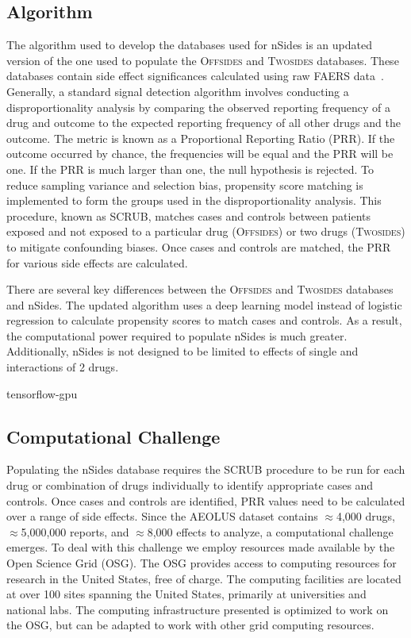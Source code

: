 \documentclass{ws-procs11x85}
\begin{document}
\subsection{Algorithm}
The algorithm used to develop the databases used for nSides is an
updated version of the one used to populate the O\textsc{ffsides} and
T\textsc{wosides} databases.  These databases contain side effect
significances calculated using raw FAERS data~\cite{Tatonetti2012}.
Generally, a standard signal detection algorithm involves conducting a
disproportionality analysis by comparing the observed reporting
frequency of a drug and outcome to the expected reporting frequency of
all other drugs and the outcome. The metric is known as a Proportional
Reporting Ratio (PRR). If the outcome occurred by chance, the
frequencies will be equal and the PRR will be one. If the PRR is much
larger than one, the null hypothesis is rejected. To reduce sampling
variance and selection bias, propensity score matching is implemented
to form the groups used in the disproportionality analysis. This
procedure, known as SCRUB, matches cases and controls between patients
exposed and not exposed to a particular drug (O\textsc{ffsides}) or
two drugs (T\textsc{wosides}) to mitigate confounding biases. Once
cases and controls are matched, the PRR for various side effects are
calculated.

There are several key differences between the O\textsc{ffsides} and
T\textsc{wosides} databases and nSides. The updated algorithm uses a
deep learning model instead of logistic regression to calculate
propensity scores to match cases and controls. As a result, the
computational power required to populate nSides is much
greater. Additionally, nSides is not designed to be limited to
effects of single and interactions of 2 drugs.

tensorflow-gpu

\subsection{Computational Challenge}

Populating the nSides database requires the SCRUB procedure to be run
for each drug or combination of drugs individually to identify
appropriate cases and controls. Once cases and controls are
identified, PRR values need to be calculated over a range of side
effects. Since the AEOLUS dataset contains $\approx$4,000 drugs,
$\approx$5,000,000 reports, and $\approx$8,000 effects to analyze, a
computational challenge emerges.  To deal with this challenge we
employ resources made available by the Open Science Grid (OSG). The
OSG provides access to computing resources for research in the United
States, free of charge. The computing facilities are located at over
100 sites spanning the United States, primarily at universities and
national labs.  The computing infrastructure presented is optimized to
work on the OSG, but can be adapted to work with other grid computing
resources.
\end{document}
